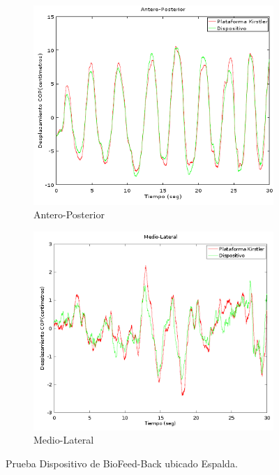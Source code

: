 \documentclass[12pt,a4paper]{article}
\newcommand{\nombreDispositivo}{Dispositivo de BioFeed-Back }
\begin{document}
	
	\begin{figure}[H]
		\centering
		\begin{subfigure}{.5\textwidth}
			\centering
			\includegraphics[width=1\linewidth]{images/pruebas/Espalda/Antero-Posterior}
			\caption{Antero-Posterior}
			\label{fig:anteroPosteriorEspalda}
		\end{subfigure}%
		\begin{subfigure}{.5\textwidth}
			\centering
			\includegraphics[width=1\linewidth]{images/pruebas/Espalda/Medio-Lateral}
			\caption{Medio-Lateral}
			\label{fig:medioLateralEspalda}
		\end{subfigure}
		\caption{Prueba \nombreDispositivo ubicado Espalda.}
		\label{fig:pruebaEspalda}
	\end{figure}
	
\end{document}

